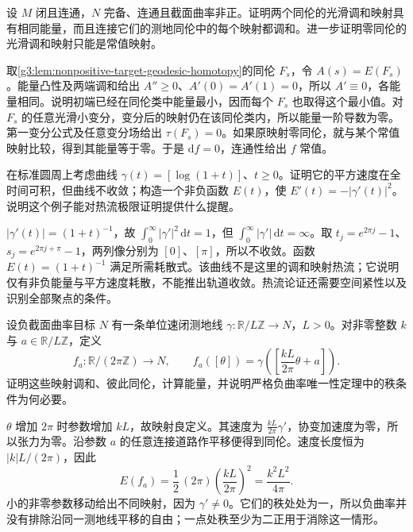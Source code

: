 \begin{exercise}\label{g3:ex:harmonic-representatives-convex-family}
	设 \(M\) 闭且连通，\(N\) 完备、连通且截面曲率非正。证明两个同伦的光滑调和映射具有相同能量，而且连接它们的测地同伦中的每个映射都调和。进一步证明零同伦的光滑调和映射只能是常值映射。
\end{exercise}
\begin{solution}
	取\cref{g3:lem:nonpositive-target-geodesic-homotopy}的同伦 \(F_s\)，令 \(A(s)=E(F_s)\)。能量凸性及两端调和给出 \(A''\ge0\)、\(A'(0)=A'(1)=0\)，所以 \(A'\equiv0\)，各能量相同。说明初端已经在同伦类中能量最小，因而每个 \(F_s\) 也取得这个最小值。对 \(F_s\) 的任意光滑小变分，变分后的映射仍在该同伦类内，所以能量一阶导数为零。第一变分公式及任意变分场给出 \(\tau(F_s)=0\)。如果原映射零同伦，就与某个常值映射比较，得到其能量等于零。于是 \(\mathrm df=0\)，连通性给出 \(f\) 常值。
\end{solution}

\begin{exercise}\label{g3:ex:square-integrable-speed-not-convergence}
	在标准圆周上考虑曲线 \(\gamma(t)=[\log(1+t)]\)、\(t\ge0\)。证明它的平方速度在全时间可积，但曲线不收敛；构造一个非负函数 \(E(t)\)，使 \(E'(t)=-|\gamma'(t)|^2\)。说明这个例子能对热流极限证明提供什么提醒。
\end{exercise}
\begin{solution}
	\(|\gamma'(t)|=(1+t)^{-1}\)，故 \(\int_0^\infty|\gamma'|^2\,\mathrm dt=1\)，但 \(\int_0^\infty|\gamma'|\,\mathrm dt=\infty\)。取 \(t_j=e^{2\pi j}-1\)、\(s_j=e^{2\pi j+\pi}-1\)，两列像分别为 \([0]\)、\([\pi]\)，所以不收敛。函数 \(E(t)=(1+t)^{-1}\) 满足所需耗散式。该曲线不是这里的调和映射热流；它说明仅有非负能量与平方速度耗散，不能推出轨道收敛。热流论证还需要空间紧性以及识别全部聚点的条件。
\end{solution}

\begin{exercise}\label{g3:ex:negative-target-rank-one-family}
	设负截面曲率目标 \(N\) 有一条单位速闭测地线 \(\gamma:\mathbb R/L\mathbb Z\to N\)，\(L>0\)。对非零整数 \(k\) 与 \(a\in\mathbb R/L\mathbb Z\)，定义
	\[
		f_a:\mathbb R/(2\pi\mathbb Z)\to N,\qquad
		f_a([\theta])=\gamma\left(\left[\frac{kL}{2\pi}\theta+a\right]\right).
	\]
	证明这些映射调和、彼此同伦，计算能量，并说明严格负曲率唯一性定理中的秩条件为何必要。
\end{exercise}
\begin{solution}
	\(\theta\) 增加 \(2\pi\) 时参数增加 \(kL\)，故映射良定义。其速度为 \(\frac{kL}{2\pi}\gamma'\)，协变加速度为零，所以张力为零。沿参数 \(a\) 的任意连接道路作平移便得到同伦。速度长度恒为 \(|k|L/(2\pi)\)，因此
	\[
		E(f_a)=\frac12\,(2\pi)\left(\frac{kL}{2\pi}\right)^2
		=\frac{k^2L^2}{4\pi}.
	\]
	小的非零参数移动给出不同映射，因为 \(\gamma'\ne0\)。它们的秩处处为一，所以负曲率并没有排除沿同一测地线平移的自由；一点处秩至少为二正用于消除这一情形。
\end{solution}

